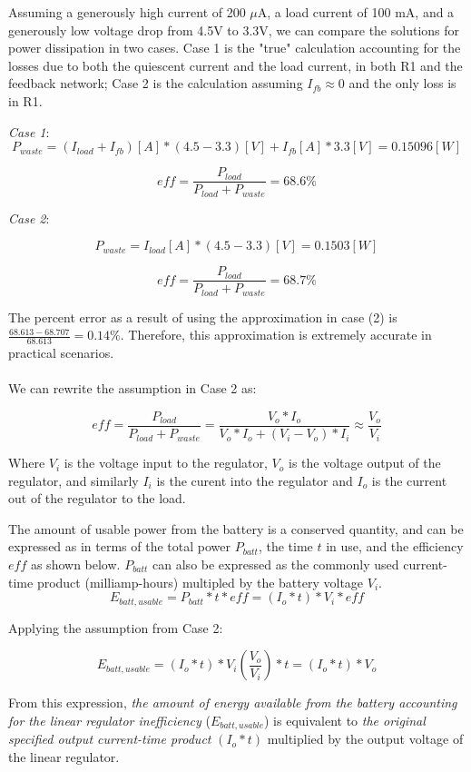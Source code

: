 \documentclass{article}
\begin{document}
Assuming a generously high current of 200 $\mu$A, a load current of 100 mA, and a generously low voltage drop from 4.5V to 3.3V, we can compare the solutions for power dissipation in two cases. Case 1 is the "true" calculation accounting for the losses due to both the quiescent current and the load current, in both R1 and the feedback network; Case 2 is the calculation assuming $I_{fb} \approx 0$ and the only loss is in R1. 

\textit{Case 1}: 
$$
P_{waste} = (I_{load} + I_{fb}) [A] * (4.5 - 3.3) [V]+ I_{fb} [A] * 3.3 [V] = 0.15096 [W]
$$

$$
eff = \frac{P_{load}}{P_{load} + P_{waste} } = 68.6\%
$$

\textit{Case 2}: 

$$
P_{waste} = I_{load} [A] * (4.5 - 3.3)[V] = 0.1503 [W]
$$

$$
eff = \frac{P_{load}}{P_{load} + P_{waste} } = 68.7\%
$$

The percent error as a result of using the approximation in case (2) is $ \frac{68.613 - 68.707}{68.613} = 0.14 \% $. Therefore, this approximation is extremely accurate in practical scenarios. 

\paragraph{}

We can rewrite the assumption in Case 2 as: 

$$
eff = \frac{P_{load}}{P_{load} + P_{waste} } = \frac{V_{o}* I_{o}}{V_{o}*I_{o} + (V_{i} - V_{o})*I_{i} }  \approx \frac{V_o}{V_i}
$$

Where $V_i$ is the voltage input to the regulator, $V_o$ is the voltage output of the regulator, and similarly $I_i$ is the curent into the regulator and $I_o$ is the current out of the regulator to the load. 

The amount of usable power from the battery is a conserved quantity, and can be expressed as in terms of the total power $P_{batt}$, the time $t$ in use, and the efficiency $eff$ as shown below. $P_{batt}$ can also be expressed as the commonly used current-time product (milliamp-hours) multipled by the battery voltage $V_i$. 
$$
E_{batt, usable} = P_{batt}*t*eff = (I_o*t)*V_i*eff
$$


Applying the assumption from Case 2:

$$
E_{batt,usable} = (I_{o} *t)* V_i \left( \frac{V_o}{V_i} \right) * t = (I_o*t)*V_o
$$

From this expression, \textit{the amount of energy available from the battery accounting for the linear regulator inefficiency} ($E_{batt, usable}$) is equivalent to \textit{the original specified output current-time product} $(I_o*t)$ multiplied by the output voltage of the linear regulator. 
\end{document}
